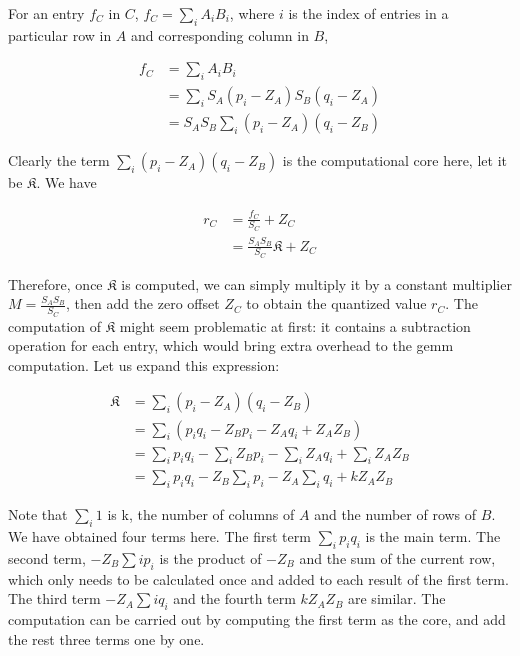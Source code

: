 For an entry $f_C$ in $C$, $f_C = \sum_{i}^{} A_i B_i$, where $i$ is the index of entries in a particular
row in $A$ and corresponding column in $B$,

\begin{equation}
\begin{split}
  f_C & = \sum_{i} A_i B_i \\
      & = \sum_{i} S_A (p_i - Z_A) S_B (q_i - Z_A) \\
      & = S_A S_B \sum_{i} (p_i - Z_A) (q_i - Z_B)
\end{split}
\end{equation}

Clearly the term $\sum_{i} (p_i - Z_A) (q_i - Z_B)$ is the computational core here, let it be
$\mathfrak{K}$. We have

\begin{equation}
\begin{split}
  r_C & = \frac{f_C}{S_C} + Z_C \\
      & = \frac{S_A S_B}{S_C} \mathfrak{K} + Z_C
\end{split}
\end{equation}

Therefore, once $\mathfrak{K}$ is computed, we can simply multiply it by a constant multiplier
$M = \frac{S_A S_B}{S_C}$, then add the zero offset $Z_C$ to obtain the quantized value $r_C$. The computation
of $\mathfrak{K}$ might seem problematic at first: it contains a subtraction operation for each entry,
which would bring extra overhead to the \gls{gemm} computation. Let us expand this expression:

\begin{equation}
\begin{split}
  \mathfrak{K} & = \sum_{i} (p_i - Z_A) (q_i - Z_B) \\
               & = \sum_{i} (p_i q_i - Z_B p_i - Z_A q_i + Z_A Z_B) \\
               & = \sum_{i} p_i q_i - \sum_{i} Z_B p_i - \sum_{i} Z_A q_i + \sum_{i} Z_A Z_B \\
               & = \sum_{i} p_i q_i - Z_B \sum_{i} p_i - Z_A \sum_{i} q_i + k Z_A Z_B
\end{split}
\end{equation}

Note that $\sum_{i} 1$ is k, the number of columns of $A$ and the number of rows of $B$. We have obtained
four terms here. The first term $\sum_{i} p_i q_i$ is the main term. The second term, $- Z_B \sum{i} p_i$
is the product of $- Z_B$ and the sum of the current row, which only needs to be calculated once and added
to each result of the first term. The third term $- Z_A \sum{i} q_i$ and the fourth term $k Z_A Z_B$ are
similar. The computation can be carried out by computing the first term as the core, and add the rest three
terms one by one.

